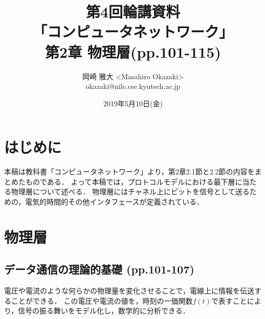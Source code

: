 \documentclass[a4paper]{ltjsarticle}
\title{第4回輪講資料 \\ 「コンピュータネットワーク」 \\ 第2章 物理層(pp.101-115)}
\author{岡崎 雅大 <Masahiro Okazaki> \\ okazaki@nile.cse.kyutech.ac.jp}
\date{2019年5月10日(金)}
\begin{document}
\maketitle
\tableofcontents

\section{はじめに}
	本稿は教科書「コンピュータネットワーク」より，第2章2.1節と2.2節の内容をまとめたものである．
	よって本稿では，プロトコルモデルにおける最下層に当たる物理層について述べる．
	物理層にはチャネル上にビットを信号として送るための，電気的時間的その他インタフェースが定義されている．

\section{物理層}
	\subsection{データ通信の理論的基礎 (pp.101-107)}
		電圧や電流のような何らかの物理量を変化させることで，電線上に情報を伝送することができる．
		この電圧や電流の値を，時刻の一価関数$f(t)$で表すことにより，信号の振る舞いをモデル化し，数学的に分析できる．
\end{document}
